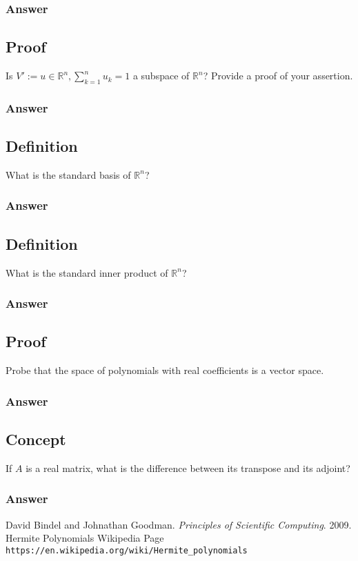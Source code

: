 \documentclass{article}
\begin{document}
		\subsubsection{Answer}
		
		\subsection{Proof}
		Is $V':={u\in\mathbb{R}^{n},\sum_{k=1}^{n}u_{k}=1}$ a subspace of $\mathbb{R}^{n}$?  Provide a proof of your assertion.	
			
		\subsubsection{Answer}
		
		\subsection{Definition}
		What is the standard basis of $\mathbb{R}^{n}$?
		
		\subsubsection{Answer}
		
		\subsection{Definition}
		What is the standard inner product of $\mathbb{R}^{n}$?
		
		\subsubsection{Answer}
		
		\subsection{Proof}
		Probe that the space of polynomials with real coefficients is a vector space.
		
		\subsubsection{Answer}
		
		\subsection{Concept}
		If $A$ is a real matrix, what is the difference between its transpose and its adjoint?
		
		\subsubsection{Answer}
		
		
\begin{thebibliography}{2}
	David Bindel and Johnathan Goodman.
	\textit{Principles of Scientific Computing}. 
	2009.
	Hermite Polynomials Wikipedia Page
	\\\texttt{https://en.wikipedia.org/wiki/Hermite\_polynomials}
\end{thebibliography}
\end{document}
